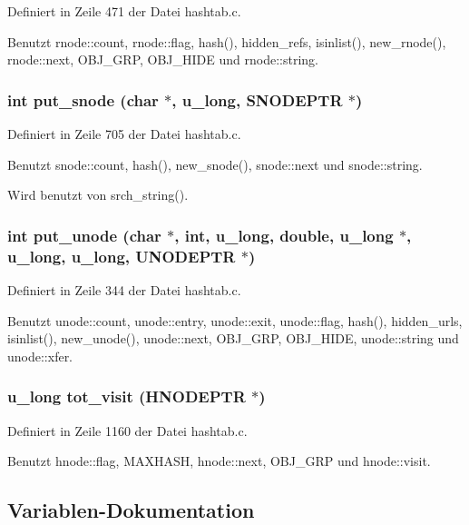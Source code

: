 Definiert in Zeile 471 der Datei hashtab.c.

Benutzt rnode::count, rnode::flag, hash(), hidden\_\-refs, isinlist(), new\_\-rnode(), rnode::next, OBJ\_\-GRP, OBJ\_\-HIDE und rnode::string.
\subsubsection{\setlength{\rightskip}{0pt plus 5cm}int put\_\-snode (char $\ast$, u\_\-long, {\bf SNODEPTR} $\ast$)}\label{hashtab_8h_e9754e3f6f6b9926edb3bf1706f8202a}




Definiert in Zeile 705 der Datei hashtab.c.

Benutzt snode::count, hash(), new\_\-snode(), snode::next und snode::string.

Wird benutzt von srch\_\-string().
\subsubsection{\setlength{\rightskip}{0pt plus 5cm}int put\_\-unode (char $\ast$, int, u\_\-long, double, u\_\-long $\ast$, u\_\-long, u\_\-long, {\bf UNODEPTR} $\ast$)}\label{hashtab_8h_96366abcaec7b7275725bb40618976ab}




Definiert in Zeile 344 der Datei hashtab.c.

Benutzt unode::count, unode::entry, unode::exit, unode::flag, hash(), hidden\_\-urls, isinlist(), new\_\-unode(), unode::next, OBJ\_\-GRP, OBJ\_\-HIDE, unode::string und unode::xfer.
\subsubsection{\setlength{\rightskip}{0pt plus 5cm}u\_\-long tot\_\-visit ({\bf HNODEPTR} $\ast$)}\label{hashtab_8h_4bdcfce12ca5e5236241cfdd1ec5288a}




Definiert in Zeile 1160 der Datei hashtab.c.

Benutzt hnode::flag, MAXHASH, hnode::next, OBJ\_\-GRP und hnode::visit.

\subsection{Variablen-Dokumentation}
